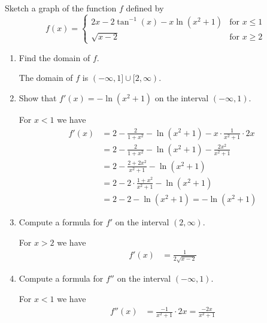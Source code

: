 \documentclass[nooutcomes]{ximera}
\begin{document}
\begin{problem}
  Sketch a graph of the function $f$ defined by
  \[
    f(x) = \begin{cases}
             2x - 2\tan^{-1}(x) - x \ln(x^2+1) & \mbox{for $x \le 1$}\\
             \sqrt{x - 2} & \mbox{for $x \ge 2$}
           \end{cases}
  \]
  \begin{enumerate}
    \item Find the domain of $f$.
      \begin{freeResponse}
        The domain of $f$ is $(-\infty, 1] \cup [2, \infty)$.
      \end{freeResponse}

    \item Show that $f'(x) = -\ln(x^2+1)$ on the interval $(-\infty, 1)$.
   \begin{freeResponse}
        For $x < 1$ we have
        \begin{align*}
          f'(x) &= 2 - \frac{2}{1+x^2} - \ln(x^2+1) - x \cdot \frac{1}{x^2+1}\cdot 2x\\
                &= 2 - \frac{2}{1+x^2} - \ln(x^2+1) - \frac{2x^2}{x^2+1}\\
                &= 2 - \frac{2 + 2x^2}{x^2+1} - \ln(x^2+1)\\
                &= 2 -  2\cdot\frac{1+x^2}{x^2+1} - \ln(x^2+1)\\
                &= 2 - 2 - \ln(x^2 +1) = -\ln(x^2+1)
        \end{align*}
      \end{freeResponse}

    \item Compute a formula for $f'$ on the interval $(2, \infty)$.
      \begin{freeResponse}
        For $x > 2$ we have
        \begin{align*}
          f'(x) &= \frac{1}{2\sqrt{x-2}}
        \end{align*}
      \end{freeResponse}

    \item Compute a formula for $f''$ on the interval $(-\infty, 1)$.
       \begin{freeResponse}
        For $x < 1$ we have
        \begin{align*}
          f''(x) &= \frac{-1}{x^2+1} \cdot 2x = \frac{-2x}{x^2+1}
        \end{align*}
      \end{freeResponse}


\end{enumerate}
\end{problem}
\end{document}
